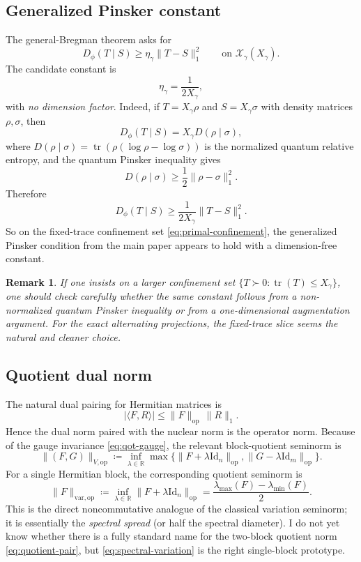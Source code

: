 \documentclass[11pt]{article}
\newcommand{\RR}{\mathbb{R}}
\newcommand{\Id}{\mathrm{Id}}
\newcommand{\tr}{\operatorname{tr}}
\newcommand{\eqdef}{\coloneqq}
\newcommand{\dotp}[2]{\langle #1,#2\rangle}
\newcommand{\Xx}{\mathcal{X}}
\newcommand{\op}{\mathrm{op}}
\newcommand{\varop}{\mathrm{var},\op}
\theoremstyle{plain}
\newtheorem{remark}{Remark}[section]
\begin{document}
\subsection{Generalized Pinsker constant}

The general-Bregman theorem asks for
\[
D_\phi(T \mid S) \ge \eta_\gamma \|T-S\|_1^2
\qquad \text{on } \Xx_\gamma(X_\gamma).
\]
The candidate constant is
\begin{equation}
\label{eq:quantum-pinsker}
\eta_\gamma = \frac{1}{2 X_\gamma},
\end{equation}
with \emph{no dimension factor}.
Indeed, if $T=X_\gamma \rho$ and $S=X_\gamma \sigma$ with density matrices $\rho,\sigma$, then
\[
D_\phi(T \mid S)
=
X_\gamma D(\rho \mid \sigma),
\]
where $D(\rho \mid \sigma)=\tr(\rho(\log \rho-\log \sigma))$ is the normalized quantum relative entropy, and the quantum Pinsker inequality gives
\[
D(\rho \mid \sigma) \ge \frac12 \|\rho-\sigma\|_1^2.
\]
Therefore
\[
D_\phi(T \mid S)
\ge
\frac{1}{2X_\gamma}\|T-S\|_1^2.
\]
So on the fixed-trace confinement set \eqref{eq:primal-confinement}, the generalized Pinsker condition from the main paper appears to hold with a dimension-free constant.

\begin{remark}
If one insists on a larger confinement set $\{T \succ 0 : \tr(T)\le X_\gamma\}$, one should check carefully whether the same constant follows from a non-normalized quantum Pinsker inequality or from a one-dimensional augmentation argument.
For the exact alternating projections, the fixed-trace slice seems the natural and cleaner choice.
\end{remark}

\subsection{Quotient dual norm}

The natural dual pairing for Hermitian matrices is
\[
|\dotp{F}{R}| \le \|F\|_{\op}\,\|R\|_1.
\]
Hence the dual norm paired with the nuclear norm is the operator norm.
Because of the gauge invariance \eqref{eq:qot-gauge}, the relevant block-quotient seminorm is
\begin{equation}
\label{eq:quotient-pair}
\|(F,G)\|_{V,\op}
\eqdef
\inf_{\lambda \in \RR}
\max\bigl\{
\|F+\lambda \Id_n\|_{\op},
\|G-\lambda \Id_m\|_{\op}
\bigr\}.
\end{equation}
For a single Hermitian block, the corresponding quotient seminorm is
\begin{equation}
\label{eq:spectral-variation}
\|F\|_{\varop}
\eqdef
\inf_{\lambda \in \RR}\|F+\lambda \Id_n\|_{\op}
=
\frac{\lambda_{\max}(F)-\lambda_{\min}(F)}{2}.
\end{equation}
This is the direct noncommutative analogue of the classical variation seminorm; it is essentially the \emph{spectral spread} (or half the spectral diameter).
I do not yet know whether there is a fully standard name for the two-block quotient norm \eqref{eq:quotient-pair}, but \eqref{eq:spectral-variation} is the right single-block prototype.
\end{document}
